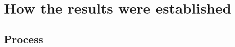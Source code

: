 
\clearpage %
\section{How the results were established}\label{app:ver}

\subsection{Process}\label{app:ver:process}

